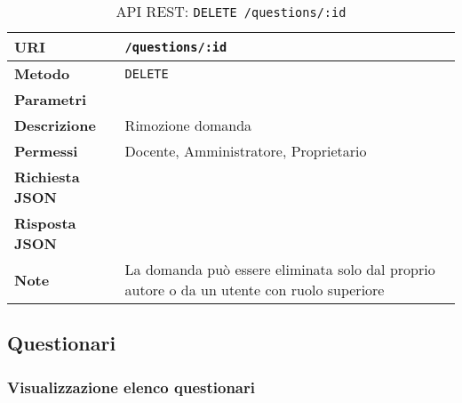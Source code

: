         \begin{table}[H]
            \begin{center}
                \begin{tabular}{p{} p{}}
                    \toprule
                    \textbf{URI} & \texttt{/questions/:id} \\ \midrule
                    \textbf{Metodo} & \texttt{DELETE} \\ \midrule
                    \textbf{Parametri} & \\ \midrule
                    \textbf{Descrizione} & Rimozione domanda \\ \midrule
                    \textbf{Permessi} & Docente, Amministratore, Proprietario  \\ \midrule
                    \textbf{Richiesta JSON} & \\ \midrule
                    \textbf{Risposta JSON} & \\ \midrule
                    \textbf{Note} & La domanda può essere eliminata solo dal proprio autore
                        o da un utente con ruolo superiore \\
                    \bottomrule
                \end{tabular}
                \caption{API REST: \texttt{DELETE /questions/:id}}
            \end{center}
        \end{table}

\subsection{Questionari}

    \subsubsection{Visualizzazione elenco questionari}

